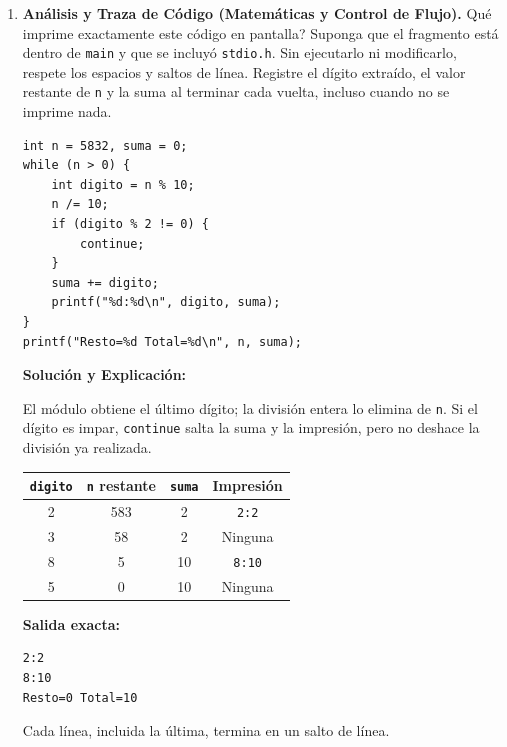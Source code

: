 \documentclass[11pt,letterpaper]{article}
\begin{document}
\begin{enumerate}[label=\textbf{\arabic*.}]
    \newpage
    \item \textbf{Análisis y Traza de Código (Matemáticas y Control de Flujo).}
    \textquestiondown{}Qué imprime exactamente este código en pantalla? Suponga que el fragmento está dentro de \texttt{main} y que se incluyó \texttt{stdio.h}. Sin ejecutarlo ni modificarlo, respete los espacios y saltos de línea. Registre el dígito extraído, el valor restante de \texttt{n} y la suma al terminar cada vuelta, incluso cuando no se imprime nada.
    \begin{lstlisting}[style=customc]
int n = 5832, suma = 0;
while (n > 0) {
    int digito = n % 10;
    n /= 10;
    if (digito % 2 != 0) {
        continue;
    }
    suma += digito;
    printf("%d:%d\n", digito, suma);
}
printf("Resto=%d Total=%d\n", n, suma);
    \end{lstlisting}
    \begin{solucionbox}
    \textbf{Solución y Explicación:}\par
    El módulo obtiene el último dígito; la división entera lo elimina de \texttt{n}. Si el dígito es impar, \texttt{continue} salta la suma y la impresión, pero no deshace la división ya realizada.
    \begin{center}
    \begin{tabular}{cccc}
    \toprule
    \texttt{digito} & \texttt{n} restante & \texttt{suma} & Impresión \\
    \midrule
    2 & 583 & 2 & \texttt{2:2} \\
    3 & 58 & 2 & Ninguna \\
    8 & 5 & 10 & \texttt{8:10} \\
    5 & 0 & 10 & Ninguna \\
    \bottomrule
    \end{tabular}
    \end{center}
    \textbf{Salida exacta:}
    \begin{lstlisting}[style=customc,numbers=none]
2:2
8:10
Resto=0 Total=10
    \end{lstlisting}
    Cada línea, incluida la última, termina en un salto de línea.
    \end{solucionbox}


\end{enumerate}
\end{document}
